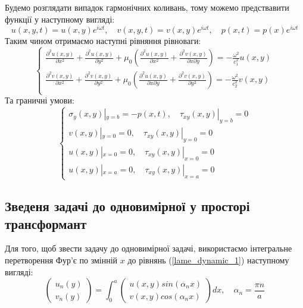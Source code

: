 Будемо розглядати випадок гармонічних коливань, тому можемо предствавити функції у наступному вигляді:
\begin{equation}
    u(x,y,t) = u(x,y) e^{i \omega t}, \quad v(x,y,t) = v(x,y) e^{i \omega t}, \quad p(x,t) = p(x) e^{i \omega t}
\end{equation}
Таким чином отримаємо наступні рівняння рівноваги:
\begin{equation}\label{lame_dynamic_1}
    \begin{cases}
        \frac{\partial^2 u(x,y)}{\partial x^2} + \frac{\partial^2 u(x,y)}{\partial y^2} + \mu_0 (\frac{\partial^2 u(x,y)}{\partial x^2} + \frac{\partial^2 v(x,y)}{\partial x\partial y}) = -\frac{\omega^2}{c_1^2}  u(x,y) \\
        \frac{\partial^2 v(x,y)}{\partial x^2} + \frac{\partial^2 v(x,y)}{\partial y^2} + \mu_0 (\frac{\partial^2 u(x,y)}{\partial x \partial y} + \frac{\partial^2 v(x,y)}{\partial y^2}) = -\frac{\omega^2}{c_2^2} v(x,y) \\
    \end{cases}
\end{equation}
Та граничні умови:
\begin{equation}\label{bound_dynamic_1}
    \begin{cases}
        \sigma_y(x, y) |_{y=b} = -p(x, t), \quad  \tau_{xy}(x,y) |_{y=b} = 0 \\
        v(x,y) |_{y=0} = 0, \quad \tau_{xy}(x,y) |_{y=0} = 0 \\
        u(x,y) |_{x=0} = 0, \quad \tau_{xy}(x,y) |_{x=0} = 0 \\
        u(x,y) |_{x=a} = 0, \quad \tau_{xy}(x,y) |_{x=a} = 0 
    \end{cases}
\end{equation}

\subsection{Зведеня задачі до одновимірної у просторі трансформант}
Для того, щоб звести задачу до одновимірної задачі, використаємо інтегральне перетворення Фур'є по змінній $x$ до рівнянь (\ref{lame_dynamic_1}) наступному вигляді:
\begin{equation}
    \begin{pmatrix}
        u_n(y) \\
        v_n(y)
    \end{pmatrix} = \int_{0}^{a} 
    \begin{pmatrix}
        u(x,y) sin(\alpha_n x) \\
        v(x,y) cos(\alpha_n x)
    \end{pmatrix} dx, \quad \alpha_n = \frac{\pi n}{a}
\end{equation}

